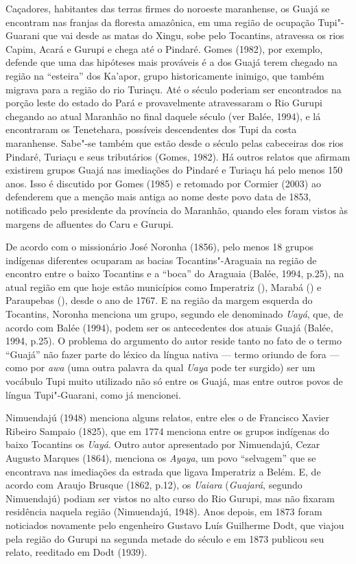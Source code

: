 Caçadores, habitantes das terras firmes do noroeste maranhense, os Guajá
se encontram nas franjas da floresta amazônica, em uma região de
ocupação Tupi"-Guarani que vai desde as matas do Xingu, sobe pelo
Tocantins, atravessa os rios Capim, Acará e Gurupi e chega até o
Pindaré. Gomes (1982), por exemplo, defende que uma das hipóteses mais
prováveis é a dos Guajá terem chegado na região na ``esteira'' dos
Ka'apor, grupo historicamente inimigo, que também migrava para a região
do rio Turiaçu. Até o século  poderiam ser encontrados na porção
leste do estado do Pará e provavelmente atravessaram o Rio Gurupi
chegando ao atual Maranhão no final daquele século (ver Balée, 1994), e
lá encontraram os Tenetehara, possíveis descendentes dos Tupi da costa
maranhense. Sabe"-se também que estão desde o século  pelas cabeceiras
dos rios Pindaré, Turiaçu e seus tributários (Gomes, 1982). Há outros
relatos que afirmam existirem grupos Guajá nas imediações do Pindaré e
Turiaçu há pelo menos 150 anos. Isso é discutido por Gomes (1985) e
retomado por Cormier (2003) ao defenderem que a menção mais antiga ao
nome deste povo data de 1853, notificado pelo presidente da província do
Maranhão, quando eles foram vistos às margens de afluentes do Caru e
Gurupi.

De acordo com o missionário José Noronha (1856), pelo menos 18 grupos
indígenas diferentes ocuparam as bacias Tocantins"-Araguaia na região de
encontro entre o baixo Tocantins e a ``boca'' do Araguaia (Balée, 1994,
p.25), na atual região em que hoje estão municípios como Imperatriz
(), Marabá () e Paraupebas (), desde
o ano de 1767. E na região da
margem esquerda do Tocantins, Noronha menciona um grupo, segundo ele
denominado \emph{Uayá}, que, de acordo com Balée (1994), podem ser os
antecedentes dos atuais Guajá (Balée, 1994, p.25). O problema do
argumento do autor reside tanto no fato de o termo ``Guajá'' não fazer
parte do léxico da língua nativa --- termo oriundo de fora --- como por
\emph{awa} (uma outra palavra da qual \emph{Uaya} pode ter surgido) ser
um vocábulo Tupi muito utilizado não só entre os Guajá, mas entre outros
povos de língua Tupi"-Guarani, como já mencionei.

Nimuendajú (1948) menciona alguns relatos, entre eles o de Francisco
Xavier Ribeiro Sampaio (1825), que em 1774 menciona entre os grupos
indígenas do baixo Tocantins os \emph{Uayá}. Outro autor apresentado por
Nimuendajú, Cezar Augusto Marques (1864), menciona os \emph{Ayaya}, um
povo ``selvagem'' que se encontrava nas imediações da estrada que ligava
Imperatriz a Belém. E, de acordo com Araujo Brusque (1862, p.12), os
\emph{Uaiara} (\emph{Guajará}, segundo Nimuendajú) podiam ser vistos no
alto curso do Rio Gurupi, mas não fixaram residência naquela região
(Nimuendajú, 1948). Anos depois, em 1873 foram noticiados novamente pelo
engenheiro Gustavo Luís Guilherme Dodt, que viajou pela região do Gurupi
na segunda metade do século  e em 1873 publicou seu relato, reeditado
em Dodt (1939).

